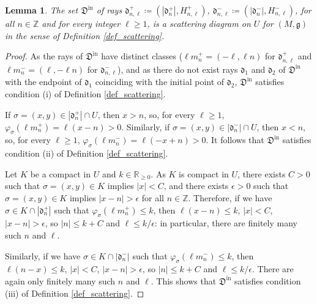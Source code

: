 \documentclass[12pt, a4paper]{amsart}
\newtheorem{lem}[defn]{Lemma}
\newcommand\R{\mathbb R}
\newcommand\Z{\mathbb Z}
\newcommand\fd{\mathfrak d}
\newcommand\fD{\mathfrak D}
\newcommand\fg{\mathfrak g}
\newcommand\iin{\mathrm{in}}
\begin{document}
\begin{lem}
The set $\fD^{\iin}$ of rays 
$\fd_{n,\ell}^+ \coloneq (|\fd_n^+|, H_{n,\ell}^+)$, $\fd_{n,\ell}^{-} \coloneq (|\fd_n^-|, H_{n,\ell}^-)$, for all 
$n \in \Z$ and for every integer $\ell \geqslant 1$, is a scattering diagram on $U$ for $(M,\fg)$ in the sense of Definition \ref{def_scattering}.
\end{lem}

\begin{proof}
As the rays of $\fD^\iin$ have distinct classes ($\ell m_n^+=(-\ell,\ell n)$ for
$\fd_{n,\ell}^+$ and 
$\ell m_n^-=(\ell, -\ell n)$ for 
$\fd_{n,\ell}^-$),
and as there do not exist rays $\fd_1$ and $\fd_2$ of $\fD^\iin$ with the endpoint of
$\fd_1$ coinciding with the initial point of $\fd_2$, $\fD^{\iin}$ satisfies condition (i)
of Definition \ref{def_scattering}.

If $\sigma=(x,y) \in |\fd_n^+| \cap U$, then $x > n$, so, for every $\ell \geqslant 1$, $\varphi_\sigma(\ell m_n^+)=\ell (
x-n) >0$. Similarly, if $\sigma=(x,y) \in |\fd_n^-| \cap U$, then $x<n$, so, for every 
$\ell \geqslant 1$,  
$\varphi_\sigma(\ell m_n^-)=\ell(-x+n)>0$. It follows that $\fD^{\iin}$ satisfies condition (ii) of 
Definition \ref{def_scattering}.

Let $K$ be a compact in $U$ and $k \in \R_{\geqslant 0}$. As $K$ is compact in $U$, there exists $C>0$ such that $\sigma=(x,y) \in K$ implies $|x|<C$, and there exists $\epsilon >0$ such that 
$\sigma=(x,y) \in K$ implies $|x-n|>\epsilon$ for all $n \in \Z$. Therefore, if we have 
$\sigma \in K \cap |\fd_n^+|$ such that 
$\varphi_\sigma(\ell m_n^+) \leqslant k$, then 
$\ell (x-n) \leqslant k$, $|x|<C$, $|x-n|>\epsilon$, so
$|n|\leqslant k+C$ and $\ell \leqslant k/\epsilon$: in particular, there are finitely many such $n$ and $\ell$. 

Similarly, if we have 
$\sigma \in K \cap |\fd_n^-|$ such that 
$\varphi_\sigma(\ell m_n^-) \leqslant k$, then 
$\ell (n-x) \leqslant k$, $|x|<C$, $|x-n|>\epsilon$, so
$|n|\leqslant k+C$ and $\ell \leqslant k/\epsilon$. There are again only finitely many such $n$ and $\ell$. This shows that $\fD^{\iin}$ satisfies condition (iii)
of Definition \ref{def_scattering}.
\end{proof}
\end{document}
